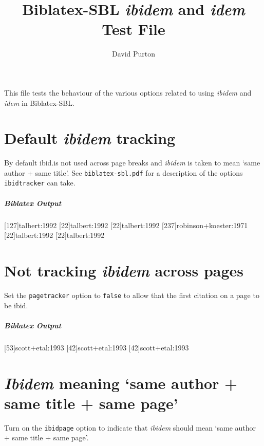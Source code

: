 \documentclass[a4paper]{article}
\title{Biblatex-SBL \emph{ibidem} and \emph{idem} Test File}
\author{David Purton}
\date{}
\newenvironment{biboutput}{%
  \subparagraph{Biblatex Output}
}{\color{black}}
\begin{document}
\maketitle

This file tests the behaviour of the various options related to using
\emph{ibidem} and \emph{idem} in Biblatex-SBL.

\section*{Default \emph{ibidem} tracking}

By default ibid.\@ is not used across page breaks and \emph{ibidem} is taken
to mean ‘same author + same title’. See \texttt{biblatex-sbl.pdf} for a
description of the options \texttt{ibidtracker} can take.

\begin{biboutput}
  [127]{talbert:1992}
  [22]{talbert:1992}
  [22]{talbert:1992}
  [237]{robinson+koester:1971}
  [22]{talbert:1992}
  \clearpage
  [22]{talbert:1992}
\end{biboutput}

\section*{Not tracking \emph{ibidem} across pages}


Set the \texttt{pagetracker} option to \texttt{false} to allow that the first
citation on a page to be ibid. 


\begin{biboutput}
  [53]{scott+etal:1993}
  [42]{scott+etal:1993}
  \clearpage
  [42]{scott+etal:1993}
\end{biboutput}

\section*{\emph{Ibidem} meaning ‘same author + same title + same page’}

Turn on the \texttt{ibidpage} option to indicate that \emph{ibidem} should
mean ‘same author + same title + same page’.
\end{document}
